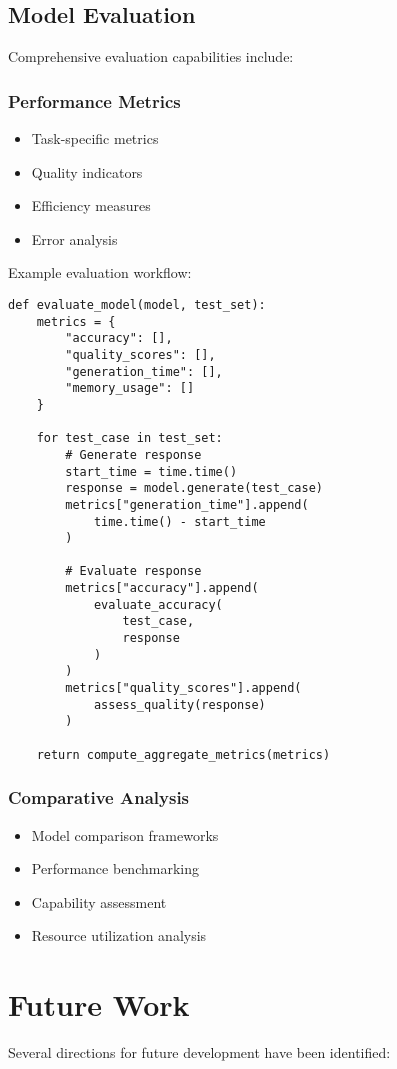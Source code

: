 \documentclass[10pt,conference]{IEEEtran}
\begin{document}
\subsection{Model Evaluation}
Comprehensive evaluation capabilities include:

\subsubsection{Performance Metrics}
\begin{itemize}
    \item Task-specific metrics
    \item Quality indicators
    \item Efficiency measures
    \item Error analysis
\end{itemize}

Example evaluation workflow:
\begin{lstlisting}
def evaluate_model(model, test_set):
    metrics = {
        "accuracy": [],
        "quality_scores": [],
        "generation_time": [],
        "memory_usage": []
    }
    
    for test_case in test_set:
        # Generate response
        start_time = time.time()
        response = model.generate(test_case)
        metrics["generation_time"].append(
            time.time() - start_time
        )
        
        # Evaluate response
        metrics["accuracy"].append(
            evaluate_accuracy(
                test_case,
                response
            )
        )
        metrics["quality_scores"].append(
            assess_quality(response)
        )
        
    return compute_aggregate_metrics(metrics)
\end{lstlisting}

\subsubsection{Comparative Analysis}
\begin{itemize}
    \item Model comparison frameworks
    \item Performance benchmarking
    \item Capability assessment
    \item Resource utilization analysis
\end{itemize}

\section{Future Work}
Several directions for future development have been identified:
\end{document}
